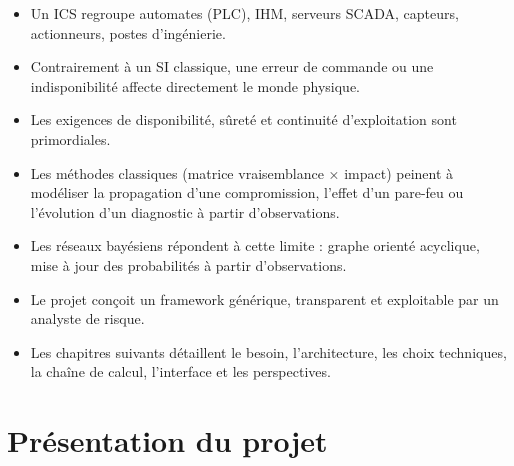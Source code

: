 \documentclass[12pt,a4paper]{article}
\begin{document}
\begin{itemize}[leftmargin=1.2cm, itemsep=0.2\baselineskip]
    \item Un ICS regroupe automates (PLC), IHM, serveurs SCADA, capteurs, actionneurs, postes d'ingénierie.
    \item Contrairement à un SI classique, une erreur de commande ou une indisponibilité affecte directement le monde physique.
    \item Les exigences de disponibilité, sûreté et continuité d'exploitation sont primordiales.
    \item Les méthodes classiques (matrice vraisemblance × impact) peinent à modéliser la propagation d'une compromission, l'effet d'un pare-feu ou l'évolution d'un diagnostic à partir d'observations.
    \item Les réseaux bayésiens répondent à cette limite : graphe orienté acyclique, mise à jour des probabilités à partir d'observations.
    \item Le projet conçoit un framework générique, transparent et exploitable par un analyste de risque.
    \item Les chapitres suivants détaillent le besoin, l'architecture, les choix techniques, la chaîne de calcul, l'interface et les perspectives.
\end{itemize}

\newpage

\section{Présentation du projet}
\end{document}
